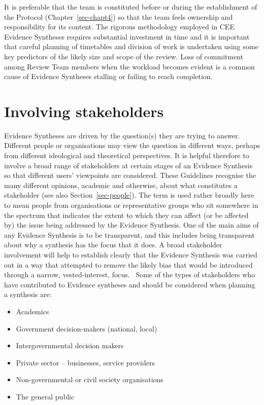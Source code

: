 \documentclass[
  letterpaper,
  DIV=11,
  numbers=noendperiod]{scrreprt}
\begin{document}
It is preferable that the team is constituted before or during the
establishment of the Protocol (Chapter~\ref{sec-chapt4}) so that the
team feels ownership and responsibility for its content. The rigorous
methodology employed in CEE Evidence Syntheses requires substantial
investment in time and it is important that careful planning of
timetables and division of work is undertaken using some key predictors
of the likely size and scope of the review. Loss of commitment among
Review Team members when the workload becomes evident is a common cause
of Evidence Syntheses stalling or failing to reach completion.

\section{\texorpdfstring{\textbf{Involving
stakeholders}}{Involving stakeholders}}\label{involving-stakeholders}

Evidence Syntheses are driven by the question(s) they are trying to
answer. Different people or organisations may view the question in
different ways, perhaps from different ideological and theoretical
perspectives. It is helpful therefore to involve a broad range of
stakeholders at certain stages of an Evidence Synthesis so that
different users' viewpoints are considered. These Guidelines recognise
the many different opinions, academic and otherwise, about what
constitutes a stakeholder (see also Section~\ref{sec-people}). The term
is used rather broadly here to mean people from organisations or
representative groups who sit somewhere in the spectrum that indicates
the extent to which they can affect (or be affected by) the issue being
addressed by the Evidence Synthesis. One of the main aims of any
Evidence Synthesis is to be transparent, and this includes being
transparent about why a synthesis has the focus that it does. A broad
stakeholder involvement will help to establish clearly that the Evidence
Synthesis was carried out in a way that attempted to remove the likely
bias that would be introduced through a narrow, vested-interest, focus.~
Some of the types of stakeholders who have contributed to Evidence
syntheses and should be considered when planning a synthesis are:

\begin{itemize}
\item
  Academics
\item
  Government decision-makers (national, local)
\item
  Intergovernmental decision makers
\item
  Private sector -- businesses, service providers
\item
  Non-governmental or civil society organisations
\item
  The general public
\end{itemize}
\end{document}
